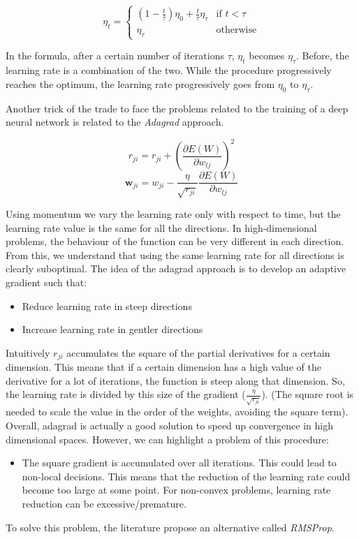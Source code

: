 $$\eta_t =
\begin{cases}
    (1-\frac{t}{\tau})\eta_0 + \frac{t}{\tau} \eta_{\tau} &\text{if $t<\tau$}\\
    \eta_\tau &\text{otherwise}
\end{cases}$$

In the formula, after a certain number of iterations $\tau$, $\eta_t$ becomes $\eta_\tau$. Before, the learning rate is a combination of the two. While the procedure progressively reaches the optimum, the learning rate progressively goes from $\eta_0$ to $\eta_\tau$. \newline

Another trick of the trade to face the problems related to the training of a deep neural network is related to the \textit{Adagrad} approach.

$$r_{ji} = r_{ji} + (\frac{\partial E(W)}{\partial w_{lj}})^2$$
$$\pmb{w}_{ji} = w_{ji} - \frac{\eta}{\sqrt{r_{ji}}} \frac{\partial E(W)}{\partial w_{lj}}$$

Using momentum we vary the learning rate only with respect to time, but the learning rate value is the same for all the directions. In high-dimensional problems, the behaviour of the function can be very different in each direction. From this, we understand that using the same learning rate for all directions is clearly suboptimal. The idea of the adagrad approach is to develop an adaptive gradient such that:
\begin{itemize}
    \item Reduce learning rate in steep directions
    \item Increase learning rate in gentler directions
\end{itemize}

Intuitively $r_{ji}$ accumulates the square of the partial derivatives for a certain dimension. This means that if a certain dimension has a high value of the derivative for a lot of iterations, the function is steep along that dimension. So, the learning rate is divided by this size of the gradient ($\frac{\eta}{\sqrt{r_{ji}}}$). (The square root is needed to scale the value in the order of the weights, avoiding the square term).\\
Overall, adagrad is actually a good solution to speed up convergence in high dimensional spaces. However, we can highlight a problem of this procedure:
\begin{itemize}
    \item The square gradient is accumulated over all iterations. This could lead to non-local decisions. This means that the reduction of the learning rate could become too large at some point. For non-convex problems, learning rate reduction can be excessive/premature.
\end{itemize}
To solve this problem, the literature propose an alternative called \textit{RMSProp}.

